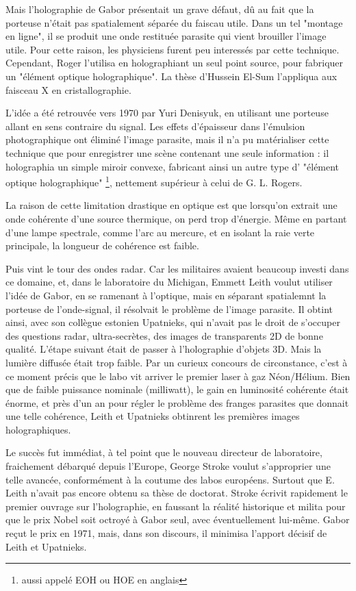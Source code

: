 \documentclass[a4paper,12pt]{article}
\begin{document}
Mais l'holographie de Gabor présentait un grave défaut, dû au fait que la porteuse n'était pas spatialement séparée du faiscau utile. Dans un tel "montage en ligne", il se produit une onde restituée parasite qui vient brouiller l'image utile. Pour cette raison, les physiciens furent peu interessés par cette technique. Cependant, Roger l'utilisa en holographiant un seul point source, pour fabriquer un "élément optique holographique". La thèse d'Hussein El-Sum l'appliqua aux faisceau X en cristallographie. 


L'idée a été retrouvée vers 1970 par Yuri Denisyuk, en utilisant une porteuse allant en sens contraire du signal. Les effets d'épaisseur dans l'émulsion photographique ont éliminé l'image parasite, mais il n'a pu matérialiser cette technique que pour enregistrer une scène contenant une seule information : il holographia un simple miroir convexe, fabricant ainsi un autre type d' "élément optique holographique" \footnote{aussi appelé EOH ou HOE en anglais}, nettement supérieur à celui de G. L. Rogers.


La raison de cette limitation drastique en optique est que lorsqu'on extrait une onde cohérente d'une source thermique, on perd trop d'énergie. Même en partant d'une lampe spectrale, comme l'arc au mercure, et en isolant la raie verte principale, la longueur de cohérence est faible. 


Puis vint le tour des ondes radar. Car les militaires avaient beaucoup investi dans ce domaine, et, dans le laboratoire du Michigan, Emmett Leith voulut utiliser l'idée de Gabor, en se ramenant à l'optique, mais en séparant spatialemnt la porteuse de l'onde-signal, il résolvait le problème de l'image parasite. Il obtint ainsi, avec son collègue estonien Upatnieks, qui n'avait pas le droit de s'occuper des questions radar, ultra-secrètes, des images de transparents 2D de bonne qualité. L'étape suivant était de passer à l'holographie d'objets 3D. Mais la lumière diffusée était trop faible. Par un curieux concours de circonstance, c'est à ce moment précis que le labo vit arriver le premier laser à gaz Néon/Hélium. Bien que de faible puissance nominale (milliwatt), le gain en luminosité cohérente était énorme, et près d'un an pour régler le problème des franges parasites que donnait une telle cohérence, Leith et Upatnieks obtinrent les premières images holographiques.


Le succès fut immédiat, à tel point que le nouveau directeur de laboratoire, fraichement débarqué depuis l'Europe, George Stroke voulut s'approprier une telle avancée, conformément à la coutume des labos européens. Surtout que E. Leith n'avait pas encore obtenu sa thèse de doctorat. Stroke écrivit rapidement le premier ouvrage sur l'holographie, en faussant la réalité historique et milita pour que le prix Nobel soit octroyé à Gabor seul, avec éventuellement lui-même. Gabor reçut le prix en 1971, mais, dans son discours, il minimisa l'apport décisif de Leith et Upatnieks.
\end{document}
